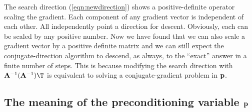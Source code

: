 \par
The search direction (\ref{eqn:newdirection}) 
shows a positive-definite operator scaling the gradient.
Each component of any gradient vector is independent of each other.
All independently point a direction for descent.
Obviously, each can be scaled by any positive number.
Now we have found that we can also scale a gradient vector by
a positive definite matrix and we can still expect
the conjugate-direction algorithm to descend, as always,
to the ``exact'' answer in a finite number of steps.
This is because modifying the search direction with
$ \bold A^{-1} (\bold A^{-1})\T$ is equivalent to solving
a conjugate-gradient problem in $\bold p$.


%

\subsection{The meaning of the preconditioning variable $\bold p$}

